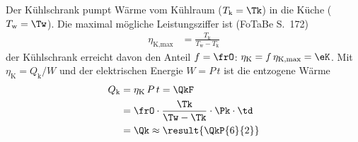 Der Kühlschrank pumpt Wärme vom Kühlraum ($T_\text{k} = \Tk$) in die Küche ($T_\text{w} = \Tw$). Die maximal mögliche Leistungsziffer ist (FoTaBe S.~172)
\begin{align}
 \eta_\text{K,max} &= \frac{T_\text{k}}{T_\text{w}-T_\text{k}}
\end{align}
der Kühlschrank erreicht davon den Anteil $f = \frO$: $\eta_\text{K} = f\,\eta_\text{K,max} = \eK$. Mit $\eta_\text{K} = Q_\text{k}/W$ und der elektrischen Energie $W = P\,t$ ist die entzogene Wärme
\begin{align}
 Q_\text{k} &= \eta_\text{K}\,P\,t = \QkF \\
   &= \frO\cdot\frac{\Tk}{\Tw-\Tk}\cdot\Pk\cdot\td \\
   &= \Qk \approx \result{\QkP{6}{2}}
\end{align}
